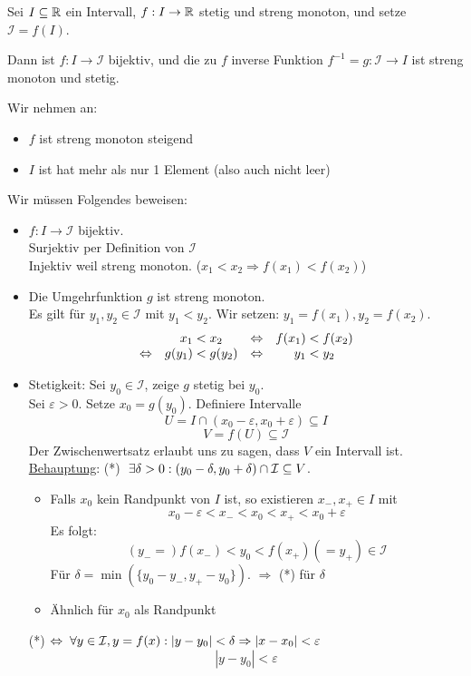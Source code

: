\documentclass[main.tex]{subfiles}
\begin{document}
\begin{Theorem}[Umkehrabbildung]
  Sei $I \subseteq \mathbb{R}$ ein Intervall, $f:I \to \mathbb{R}$ stetig und streng monoton, und setze $\mathcal{I} = f(I)$.

  Dann ist $f: I \to \mathcal{I}$ bijektiv, und die zu $f$ inverse Funktion $f^{-1} = g: \mathcal{I} \to I$ ist streng monoton und stetig.
\end{Theorem}

\begin{Beweis}
  Wir nehmen an:
  \begin{itemize}
    \item $f$ ist streng monoton steigend
    \item $I$ ist hat mehr als nur 1 Element (also auch nicht leer)
  \end{itemize}
  Wir müssen Folgendes beweisen:
  \begin{itemize}
    \item $f: I \to \mathcal{I}$ bijektiv.\\
      Surjektiv per Definition von $\mathcal{I}$\\
      Injektiv weil streng monoton. ($x_1 < x_2 \Rightarrow f(x_1) < f(x_2)$)
    \item Die Umgehrfunktion $g$ ist streng monoton.\\
      Es gilt für $y_1,y_2 \in \mathcal{I}$ mit $y_1 < y_2$. Wir setzen: $y_1 = f(x_1), y_2 = f(x_2)$.
      $$\begin{array}{c c c c}
        & x_1 < x_2 & \Leftrightarrow & f(x_1) < f(x_2) \\
        \Leftrightarrow & g(y_1) < g(y_2) & \Leftrightarrow & y_1 < y_2
      \end{array}$$
    \item Stetigkeit: Sei $y_0 \in \mathcal{I}$, zeige $g$ stetig bei $y_0$.\\
      Sei $\varepsilon > 0$. Setze $x_0 = g(y_0)$. Definiere Intervalle
      $$U = I \cap (x_0 - \varepsilon, x_0 + \varepsilon) \subseteq I$$
      $$V = f(U) \subseteq \mathcal{I}$$
      Der Zwischenwertsatz erlaubt uns zu sagen, dass $V$ ein Intervall ist.\\
      \underline{Behauptung}: (*) $\;\exists \delta > 0 : (y_0-\delta , y_0 + \delta) \cap \mathcal{I} \subseteq V$.
      \begin{itemize}
        \item   Falls $x_0$ kein Randpunkt von $I$ ist, so existieren $x_-,x_+ \in I$ mit
          $$x_0 - \varepsilon < x_- < x_0 < x_+ < x_0+\varepsilon$$
          Es folgt:
          $$ (y_- = )f(x_-)<y_0 < f(x_+) (= y_+) \in \mathcal{I}$$
          Für $\delta = \min(\{y_0 - y_-,y_+ - y_0 \})$. $\Rightarrow$ (*) für $\delta$
        \item Ähnlich für $x_0$ als Randpunkt
      \end{itemize}
    (*) $\Leftrightarrow \;\forall y \in \mathcal{I}, y = f(x) : |y - y_0| < \delta \Rightarrow |x - x_0| < \varepsilon$
    $$|y - y_0| < \varepsilon$$
  \end{itemize}
\end{Beweis}
\end{document}
